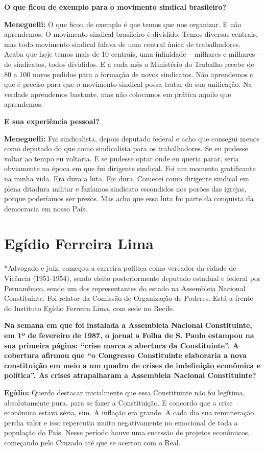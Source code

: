 \textbf{O que ficou de exemplo para o movimento sindical brasileiro?}

\textbf{Meneguelli:} O que ficou de exemplo é que temos que nos
organizar. E não aprendemos. O movimento sindical brasileiro é dividido.
Temos diversas centrais, mas todo movimento sindical falava de uma
central única de trabalhadores. Acaba que hoje temos mais de 10
centrais, uma infinidade -- milhares e milhares -- de sindicatos, todos
divididos. E a cada mês o Ministério do Trabalho recebe de 80 a 100
novos pedidos para a formação de novos sindicatos. Não aprendemos o que
é preciso para que o movimento sindical possa tratar da sua unificação.
Na verdade aprendemos bastante, mas não colocamos em prática aquilo que
aprendemos.

\textbf{E sua experiência pessoal?}

\textbf{Meneguelli:} Fui sindicalista, depois deputado federal e acho
que consegui menos como deputado do que como sindicalista para os
trabalhadores. Se eu pudesse voltar ao tempo eu voltaria. E se pudesse
optar onde eu queria parar, seria obviamente na época em que fui
dirigente sindical. Foi um momento gratificante na minha vida. Era dura
a luta. Foi dura. Comecei como dirigente sindical em plena ditadura
militar e fazíamos sindicato escondidos nos porões das igrejas, porque
poderíamos ser presos. Mas acho que essa luta foi parte da conquista da
democracia em nosso País.

\section{Egídio Ferreira Lima}

*Advogado e juíz, começou a carreira política como vereador da cidade de
Vicência (1951-1954), sendo eleito posteriormente deputado estadual e
federal por Pernambuco, sendo um dos representantes do estado na
Assembleia Nacional Constituinte. Foi relator da Comissão de Organização
de Poderes. Está a frente do Instituto Egídio Ferreira Lima, com sede no
Recife.

\textbf{Na semana em que foi instalada a Assembleia Nacional
Constituinte, em 1º de fevereiro de 1987, o jornal a Folha de S. Paulo
estampou na sua primeira página: ``crise marca a abertura da
Constituinte''. A cobertura afirmou que ``o Congresso Constituinte
elaboraria a nova constituição em meio a um quadro de crises de
indefinição econômica e política''. As crises atrapalharam a Assembleia
Nacional Constituinte?}

\textbf{Egídio:} Querdo destacar inicialmente que essa Constituinte não
foi legítima, absolutamente pura, para se fazer a Constituição. E
concordo que a crise econômica estava séria, sim. A inflação era grande.
A cada dia sua remuneração perdia valor e isso repercutia muito
negativamente no emocional de toda a população do País. Nesse período
houve uma sucessão de projetos econômicos, começando pelo Cruzado até
que se acertou com o Real.

